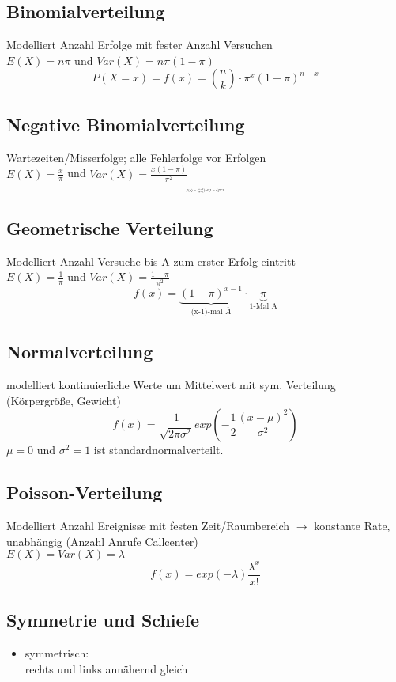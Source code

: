 \documentclass[10pt,a4paper,landscape]{article}
\begin{document}
\begin{multicols}{4}
\subsection{Binomialverteilung}
Modelliert Anzahl Erfolge mit fester Anzahl Versuchen\\
$E(X)=n\pi$ und $Var(X)=n\pi(1-\pi)$
\[
P(X=x)=f(x)=\binom{n}{k} \cdot \pi^x(1-\pi)^{n-x}
\]


\subsection{Negative Binomialverteilung}
Wartezeiten/Misserfolge; alle Fehlerfolge vor Erfolgen \\
$E(X)=\frac{x}{\pi}$ und $Var(X)=\frac{x(1-\pi)}{\pi^2}$
\[\resizebox{0.1\textwidth}{!}{$
f(x)=\binom{n-1}{k-1}\pi ^x(1-\pi)^{n-x}
$}
\]


\subsection{Geometrische Verteilung}
Modelliert Anzahl Versuche bis A zum erster Erfolg eintritt\\
$E(X)=\frac{1}{\pi}$ und $Var(X)=\frac{1-\pi}{\pi^2}$
\[
f(x)= \underbrace{(1 - \pi)^{x-1}}_{\text{(x-1)-mal } \overline{A}}
 \cdot \underbrace{\pi}_{\text{1-Mal A}}
\]

\subsection{Normalverteilung}
modelliert kontinuierliche Werte um Mittelwert mit sym. Verteilung (Körpergröße, Gewicht) \\

\[
f(x)=\frac{1}{\sqrt{2 \pi \sigma^2}}exp\left(-\frac{1}{2}\frac{(x-\mu)^2}{\sigma^2}\right)
\]
$\mu = 0$ und $\sigma^2 = 1$ ist standardnormalverteilt.


\subsection{Poisson-Verteilung}
Modelliert Anzahl Ereignisse mit festen Zeit/Raumbereich $\rightarrow$ konstante Rate, unabhängig (Anzahl Anrufe Callcenter) \\
$E(X)=Var(X)=\lambda$
\[
f(x)=exp(-\lambda)\frac{\lambda^x}{x!}
\]

\subsection{Symmetrie und Schiefe}
\begin{itemize}
\item symmetrisch: \\
rechts und links annähernd gleich


\end{itemize}
\end{multicols}
\end{document}
